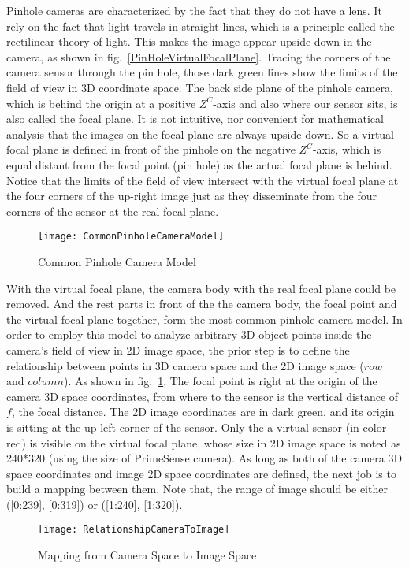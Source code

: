 %
%
Pinhole cameras are characterized by the fact that they do not have a lens. It rely on the fact that light travels in straight lines, which is a principle called the rectilinear theory of light. This makes the image appear upside down in the camera, as shown in fig.~\ref{PinHoleVirtualFocalPlane}. Tracing the corners of the camera sensor through the pin hole, those dark green lines show the limits of the field of view in 3D coordinate space. The back side plane of the pinhole camera, which is behind the origin at a positive \(Z^C\)-axis and also where our sensor sits, is also called the focal plane. It is not intuitive, nor convenient for mathematical analysis that the images on the focal plane are always upside down. So a virtual focal plane is defined in front of the pinhole on the negative \(Z^C\)-axis, which is equal distant from the focal point (pin hole) as the actual focal plane is behind. Notice that the limits of the field of view intersect with the virtual focal plane at the four corners of the up-right image just as they disseminate from the four corners of the sensor at the real focal plane.

\begin{figure}[b]
\centering
\texttt{[image: CommonPinholeCameraModel]}
\caption{Common Pinhole Camera Model}
\label{CommonPinholeCameraModel}
\end{figure}%
%

With the virtual focal plane, the camera body with the real focal plane could be removed. And the rest parts in front of the the camera body, the focal point and the virtual focal plane together, form the most common pinhole camera model. In order to employ this model to analyze arbitrary 3D object points inside the camera's field of view in 2D image space, the prior step is to define the relationship between points in 3D camera space and the 2D image space (\(row\) and \(column\)). As shown in fig.~\ref{CommonPinholeCameraModel}, The focal point is right at the origin of the camera 3D space coordinates, from where to the sensor is the vertical distance of \(f\), the focal distance. The 2D image coordinates are in dark green, and its origin is sitting at the up-left corner of the sensor. Only the a virtual sensor (in color red) is visible on the virtual focal plane, whose size in 2D image space is noted as 240*320 (using the size of PrimeSense camera). As long as both of the camera 3D space coordinates and image 2D space coordinates are defined, the next job is to build a mapping between them. Note that, the range of image should be either ([0:239], [0:319]) or ([1:240], [1:320]).
%
\begin{figure}[b]
\centering
\texttt{[image: RelationshipCameraToImage]}
\caption{Mapping from Camera Space to Image Space}
\label{RelationshipCameraToImage}
\end{figure}%
%

